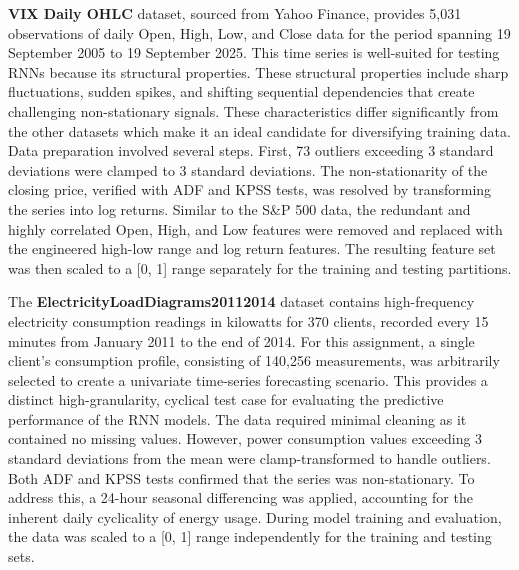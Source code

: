 \documentclass[conference, 10pt]{IEEEtran}
\begin{document}
\textbf{VIX Daily OHLC} dataset, sourced from Yahoo Finance,
provides 5,031 observations of daily Open, High, Low, and Close data for the period spanning 19 September 2005 to 19
September 2025. This time series is well-suited for testing RNNs because its structural properties. These structural
properties include sharp fluctuations, sudden spikes, and shifting sequential dependencies that create challenging
non-stationary signals. These characteristics differ significantly from the other datasets which make it an ideal
candidate for diversifying training data. Data preparation involved several steps. First, 73
outliers exceeding 3 standard deviations were clamped to 3 standard deviations. The non-stationarity of the closing
price, verified with ADF and KPSS tests, was resolved by transforming the series into log returns. Similar to the S\&P
500 data, the redundant and highly correlated Open, High, and Low features were removed and replaced with the engineered
high-low range and log return features. The resulting feature set was then scaled to a [0, 1] range separately for the
training and testing partitions.

The \textbf{ElectricityLoadDiagrams20112014} dataset contains high-frequency electricity consumption readings in
kilowatts for 370 clients, recorded every 15 minutes from January 2011 to the end of 2014. For this assignment, a single
client's consumption profile, consisting of 140,256 measurements, was arbitrarily selected to create a univariate
time-series forecasting scenario. This provides a distinct high-granularity, cyclical test case for evaluating the
predictive performance of the RNN models. The data required minimal cleaning as it contained no missing values. However,
power consumption values exceeding 3 standard deviations from the mean were clamp-transformed to handle outliers. Both
ADF and KPSS tests confirmed that the series was non-stationary. To address this, a 24-hour seasonal differencing was
applied, accounting for the inherent daily cyclicality of energy usage. During model training and evaluation, the data
was scaled to a [0, 1] range independently for the training and testing sets.
\end{document}
